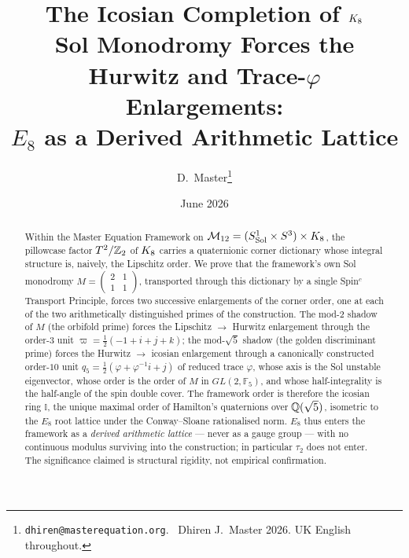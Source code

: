 \documentclass[11pt,a4paper]{article}
\title{\textbf{The Icosian Completion of $K_8$}\\[0.5em]
\large Sol Monodromy Forces the Hurwitz and Trace-$\varphi$ Enlargements:\\
$E_8$ as a Derived Arithmetic Lattice}
\author{D.~Master\thanks{\texttt{dhiren@masterequation.org}. \textcopyright\ Dhiren J.~Master 2026. UK English throughout.}}
\date{June 2026}
\theoremstyle{plain}
\theoremstyle{definition}
\theoremstyle{remark}
\newcommand{\Ico}{\mathbb{I}}
\newcommand{\FF}[1]{\mathbb{F}_{#1}}
\begin{document}
\maketitle
\thispagestyle{fancy}

\begin{abstract}
\noindent
Within the Master Equation Framework on $\mathcal{M}_{12} = (S^1_{\mathrm{Sol}} \times S^3) \times K_8$, the pillowcase factor $T^2/\mathbb{Z}_2$ of $K_8$ carries a quaternionic corner dictionary whose integral structure is, naively, the Lipschitz order. We prove that the framework's own Sol monodromy $M = \left(\begin{smallmatrix}2&1\\1&1\end{smallmatrix}\right)$, transported through this dictionary by a single Spin$^c$ Transport Principle, forces two successive enlargements of the corner order, one at each of the two arithmetically distinguished primes of the construction. The mod-$2$ shadow of $M$ (the orbifold prime) forces the Lipschitz $\to$ Hurwitz enlargement through the order-$3$ unit $\varpi = \tfrac12(-1+i+j+k)$; the mod-$\sqrt5$ shadow (the golden discriminant prime) forces the Hurwitz $\to$ icosian enlargement through a canonically constructed order-$10$ unit $q_5 = \tfrac12(\varphi + \varphi^{-1}i + j)$ of reduced trace $\varphi$, whose axis is the Sol unstable eigenvector, whose order is the order of $M$ in $GL(2,\FF{5})$, and whose half-integrality is the half-angle of the spin double cover. The framework order is therefore the icosian ring $\Ico$, the unique maximal order of Hamilton's quaternions over $\mathbb{Q}(\sqrt5)$, isometric to the $E_8$ root lattice under the Conway--Sloane rationalised norm. $E_8$ thus enters the framework as a \emph{derived arithmetic lattice} --- never as a gauge group --- with no continuous modulus surviving into the construction; in particular $\tau_2$ does not enter. The significance claimed is structural rigidity, not empirical confirmation.
\end{abstract}
\end{document}
